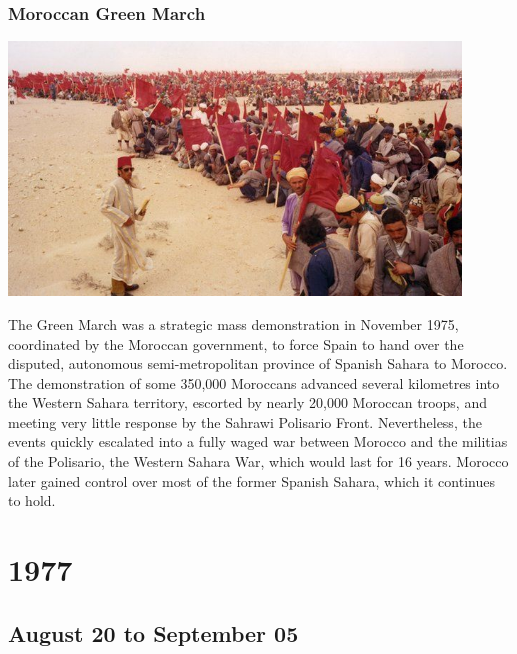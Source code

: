 \documentclass[11pt]{report}
\begin{document}
\subsection{Moroccan Green March}
\vspace{2mm}\begin{center}\includegraphics[width=12cm]{./img/greenmarch.jpg}\end{center}
The Green March was a strategic mass demonstration in November 1975, coordinated by the Moroccan government, to force Spain to hand over the disputed, autonomous semi-metropolitan province of Spanish Sahara to Morocco. The demonstration of some 350,000 Moroccans advanced several kilometres into the Western Sahara territory, escorted by nearly 20,000 Moroccan troops, and meeting very little response by the Sahrawi Polisario Front. Nevertheless, the events quickly escalated into a fully waged war between Morocco and the militias of the Polisario, the Western Sahara War, which would last for 16 years. Morocco later gained control over most of the former Spanish Sahara, which it continues to hold.

\chapter{1977}
\section{August 20 to September 05}
\end{document}

